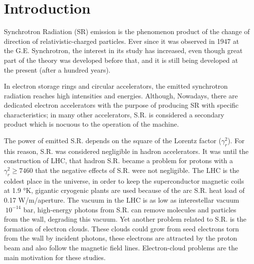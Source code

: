 
\chapter{Introduction} %

\label{intro} %



Synchrotron Radiation (SR)  emission is the phenomenon
product of the change of direction of relativistic-charged particles.  Ever
since it was observed in 1947 at the G.E. Synchrotron,  the
interest in its study has increased, even though great part of the theory was
developed before that, and it is still being developed at the present (after a
hundred years).

In electron storage rings and circular accelerators, the emitted synchrotron
radiation reaches high intensities and energies. Although, Nowadays, there are
dedicated electron accelerators with the purpose of producing SR with specific
characteristics; in many other accelerators, S.R. is considered a secondary
product which is nocuous to the operation of the machine.

The power of emitted S.R. depends on the square of the Lorentz factor
(\(\gamma_r^{2}\)). For this reason, S.R. was considered negligible in hadron
accelerators. It was until the construction of LHC, that hadron S.R. became a
problem for protons with a \(\gamma_r^{2}\geq 7460\) that the negative effects of
S.R. were not negligible. The LHC is the coldest place in the universe, in order
to keep the superconductor magnetic coils at 1.9 °K, gigantic cryogenic plants
are used because of the arc S.R. heat load of 0.17 W/m/aperture. The vacuum in
the LHC is as low as interestellar vacuum \(~10^{-14}\) bar, high-energy photons
from S.R. can remove molecules and particles from the wall, degrading this
vacuum.  Yet another problem related to S.R. is the formation of electron
clouds. These clouds could grow from seed electrons torn from the wall by
incident photons, these electrons are attracted by the proton beam and also
follow the magnetic field lines. Electron-cloud problems are the main motivation
for these studies.

